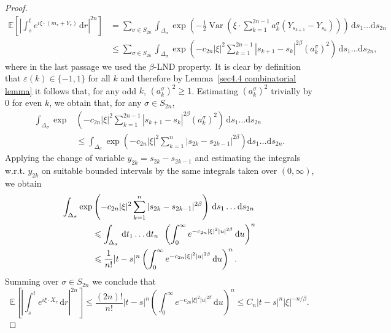 \documentclass[10pt]{article}
\newcommand{\mathd}{\mathrm{d}}
\newcommand{\tmop}[1]{\ensuremath{\operatorname{#1}}}
\begin{document}
\begin{proof}
  \begin{align*}
    \mathbb{E} \left[ \left| \int_s^t e^{i \xi \cdot (m_r + Y_r)} \, \mathd r
    \right|^{2 n} \right] & = \sum_{\sigma \in S_{2 n}} \int_{\Delta_{\sigma}}
    \exp \left( - \frac{1}{2} \tmop{Var} \left( \xi \cdot \sum_{k = 1}^{2 n -
    1} a_k^{\sigma} (Y_{s_{k + 1}} - Y_{s_k}) \right) \right) \, \mathd s_1
    \ldots \mathd s_{2 n}\\
    & \leqslant \sum_{\sigma \in S_{2 n}} \int_{\Delta_{\sigma}} \exp \left(
    - c_{2 n} | \xi |^2  \sum_{k = 1}^{2 n - 1} | s_{k + 1} - s_k |^{2 \beta}
    (a_k^{\sigma})^2 \right) \, \mathd s_1 \ldots \mathd s_{2 n},
  \end{align*}
%  
  where in the last passage we used the $\beta$\mbox{-}LND property. It is
  clear by definition that $\varepsilon (k) \in \{ - 1, 1 \}$ for all $k$ and
  therefore by Lemma~\ref{sec4.4 combinatorial lemma} it follows that, for any
  odd $k$, $(a_k^{\sigma})^2 \geqslant 1$. Estimating $(a_k^{\sigma})^2$
  trivially by $0$ for even $k$, we obtain that, for any $\sigma \in S_{2 n}$,
%  
  \begin{align*}
    \int_{\Delta_{\sigma}} \exp & \left( - c_{2 n} | \xi |^2 \sum_{k = 1}^{2 n
    - 1} | s_{k + 1} - s_k |^{2 \beta} (a_k^{\sigma})^2 \right) \, \mathd s_1
    \ldots \mathd s_{2 n}\\
    & \leqslant \int_{\Delta_{\sigma}} \exp \left( - c_{2 n} | \xi |^2
    \sum_{k = 1}^n | s_{2 k} - s_{2 k - 1} |^{2 \beta} \right) \mathd s_1
    \ldots \mathd s_{2 n} .
  \end{align*}
%  
  Applying the change of variable $y_{2 k} = s_{2 k} - s_{2 k - 1}$ and
  estimating the integrals w.r.t. $y_{2 k}$ on suitable bounded intervals by
  the same integrals taken over $(0, \infty)$, we obtain
%  
  \begin{align*}
    \int_{\Delta_{\sigma}} \exp & \left( - c_{2 n} | \xi |^2 \sum_{k = 1}^n |
    s_{2 k} - s_{2 k - 1} |^{2 \beta} \right) \, \mathd s_1 \ldots \mathd s_{2
    n}\\
    & \leqslant \int_{\Delta_{\sigma}} \, \mathd t_1 \ldots \mathd t_n
    \hspace{0.5em} \left( \int_0^{\infty} e^{- c_{2 n} | \xi |^2 | u |^{2
    \beta}} \, \mathd u \right)^n\\
    & \leqslant \frac{1}{n!} | t - s |^n \left( \int_0^{\infty} e^{- c_{2 n}
    | \xi |^2 | u |^{2 \beta}} \, \mathd u \right)^n .
  \end{align*}
%  
  Summing over $\sigma \in S_{2 n}$ we conclude that
  \[ \mathbb{E} \left[ \left| \int_s^t e^{i \xi \cdot X_r} \, \mathd r
     \right|^{2 n} \right] \leqslant \frac{(2 n) !}{n!}  | t - s |^n \left(
     \int_0^{\infty} e^{- c_{2 n} | \xi |^2 | u |^{2 \beta}} \, \mathd u
     \right)^n \leqslant C_n | t - s |^n  | \xi |^{- n / \beta} . \]
\end{proof}
\end{document}
